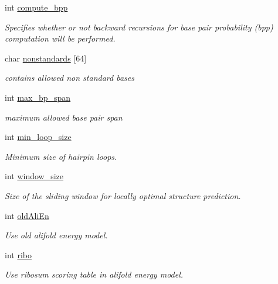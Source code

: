 \begin{DoxyCompactItemize}
int \mbox{\hyperlink{group__model__details_aa0c3e03d9064363e27adcc92b8d0380f}{compute\+\_\+bpp}}
\begin{DoxyCompactList}\small\item\em Specifies whether or not backward recursions for base pair probability (bpp) computation will be performed. \end{DoxyCompactList}\item 
char \mbox{\hyperlink{group__model__details_a3fde4ac9eaf972f503c7a76726cefb59}{nonstandards}} \mbox{[}64\mbox{]}
\begin{DoxyCompactList}\small\item\em contains allowed non standard bases \end{DoxyCompactList}\item 
int \mbox{\hyperlink{group__model__details_a659e5fcc6e8c9f1a68e7de6548eef3b0}{max\+\_\+bp\+\_\+span}}
\begin{DoxyCompactList}\small\item\em maximum allowed base pair span \end{DoxyCompactList}\item 
int \mbox{\hyperlink{group__model__details_a9ed7ba42fcc46915c5c0c524f3d255f5}{min\+\_\+loop\+\_\+size}}
\begin{DoxyCompactList}\small\item\em Minimum size of hairpin loops. \end{DoxyCompactList}\item 
int \mbox{\hyperlink{group__model__details_abea42f9229f8d8d6bcbedef316315bfc}{window\+\_\+size}}
\begin{DoxyCompactList}\small\item\em Size of the sliding window for locally optimal structure prediction. \end{DoxyCompactList}\item 
int \mbox{\hyperlink{group__model__details_ab53aec4503130877973c6111ae6f0f76}{old\+Ali\+En}}
\begin{DoxyCompactList}\small\item\em Use old alifold energy model. \end{DoxyCompactList}\item 
int \mbox{\hyperlink{group__model__details_a3df2ae4bd9c133ef8ab92a53b1d035ec}{ribo}}
\begin{DoxyCompactList}\small\item\em Use ribosum scoring table in alifold energy model. \end{DoxyCompactList}\item 

\end{DoxyCompactItemize}
